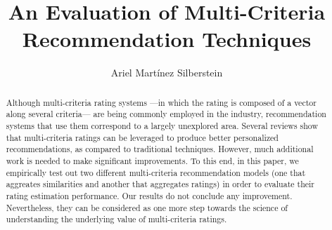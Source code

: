 \documentclass[sigconf,authordraft]{acmart}
\begin{document}
\title[An Evaluation of Multi-Criteria Recommendation Techniques]{An Evaluation of Multi-Criteria Recommendation Techniques}


\author{Ariel Martínez Silberstein}

\renewcommand{\shortauthors}{A. Martínez}

\begin{abstract}
Although multi-criteria rating systems —in which the rating is composed of a vector along several criteria— are being commonly employed in the industry, recommendation systems that use them correspond to a largely unexplored area. Several reviews show that multi-criteria ratings can be leveraged to produce better personalized recommendations, as compared to traditional techniques. However, much additional work is needed to make significant improvements. To this end, in this paper, we empirically test out two different multi-criteria recommendation models (one that aggreates similarities and another that aggregates ratings) in order to evaluate their rating estimation performance. Our results do not conclude any improvement. Nevertheless, they can be considered as one more step towards the science of understanding the underlying value of multi-criteria ratings.
\end{abstract}




\maketitle
\end{document}
